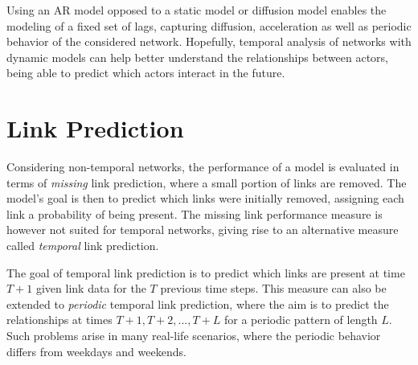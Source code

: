     Using an AR model opposed to a static model or diffusion model enables the modeling of a fixed set of lags, capturing diffusion, acceleration as well as periodic behavior of the considered network.
    Hopefully, temporal analysis of networks with dynamic models can help better understand the relationships between actors, being able to predict which actors interact in the future.

\section{Link Prediction}

    Considering non-temporal networks, the performance of a model is evaluated in terms of \emph{missing} link prediction, where a small portion of links are removed. The model's goal is then to predict which links were initially removed, assigning each link a probability of being present. The missing link performance measure is however not suited for temporal networks, giving rise to an alternative measure called \emph{temporal} link prediction.
    
    The goal of temporal link prediction is to predict which links are present at time $T+1$ given link data for the $T$ previous time steps.
    This measure can also be extended to \emph{periodic} temporal link prediction, where the aim is to predict the relationships at times $T+1, T+2, ..., T+L$ for a periodic pattern of length $L$. Such problems arise in many real-life scenarios, where the periodic behavior differs from weekdays and weekends. 




    
